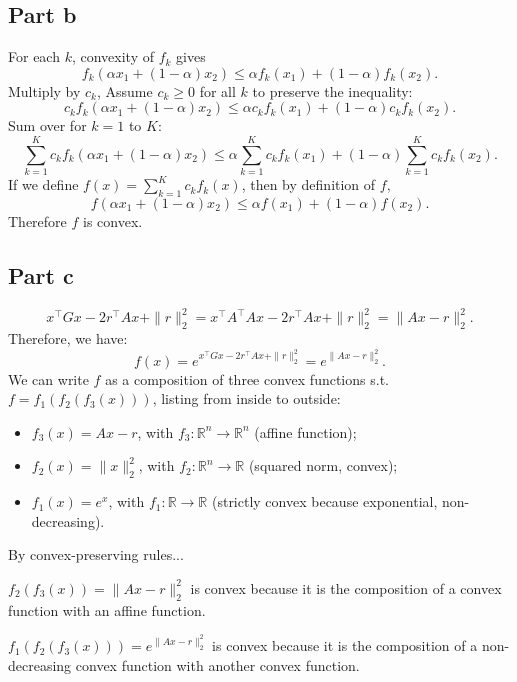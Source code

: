 \documentclass{article}
\begin{document}
    \subsection{Part b}

    For each $k$, convexity of $f_k$ gives
    \[
        f_k(\alpha x_1 + (1-\alpha)x_2) \leq \alpha f_k(x_1) + (1-\alpha) f_k(x_2).
    \]
    Multiply by $c_k$, Assume $c_k \geq 0$ for all $k$ to preserve the inequality:
    \[
        c_k f_k(\alpha x_1 + (1-\alpha)x_2) \leq \alpha c_k f_k(x_1) + (1-\alpha) c_k f_k(x_2).
    \]
    Sum over for $k = 1$ to $K$:
    \[
        \sum_{k=1}^K c_k f_k(\alpha x_1 + (1-\alpha)x_2) \leq \alpha \sum_{k=1}^K c_k f_k(x_1) + (1-\alpha) \sum_{k=1}^K c_k f_k(x_2).
    \]
    If we define $f(x) = \sum_{k=1}^K c_k f_k(x)$, then by definition of $f$,
    \[
        f(\alpha x_1 + (1-\alpha)x_2) \leq \alpha f(x_1) + (1-\alpha) f(x_2).
    \]
    \noindent Therefore $f$ is convex.

    \newpage
    \subsection{Part c}

    \[
        x^\top G x - 2 r^\top A x + \|r\|_2^2
        = x^\top A^\top A x - 2 r^\top A x + \|r\|_2^2
        = \|Ax - r\|_2^2.
    \]
    \medskip
    Therefore, we have:
    \medskip
    \[
        f(x) = e^{x^\top G x - 2 r^\top A x + \|r\|_2^2}
        = e^{\|Ax - r\|_2^2}.
    \]
    \medskip
    \noindent We can write $f$ as a composition of three convex functions s.t. $f = f_1(f_2(f_3(x)))$, listing from inside to outside:
    \begin{itemize}
        \item $f_3(x) = Ax - r$, with $f_3 : \mathbb{R}^n \to \mathbb{R}^n$ (affine function);
        \item $f_2(x) = \|x\|_2^2$, with $f_2 : \mathbb{R}^n \to \mathbb{R}$ (squared norm, convex);
        \item $f_1(x) = e^{x}$, with $f_1 : \mathbb{R} \to \mathbb{R}$ (strictly convex because exponential, non-decreasing).
    \end{itemize}
    \medskip
    By convex-preserving rules...
    
    \medskip
    \noindent$f_2(f_3(x)) = \|Ax - r\|_2^2$ is convex because it is the composition of a convex function with an affine function.

    \medskip
    \noindent$f_1(f_2(f_3(x))) = e^{\|Ax - r\|_2^2}$ is convex because it is the composition of a non-decreasing convex function with another convex function.
    
\end{document}
